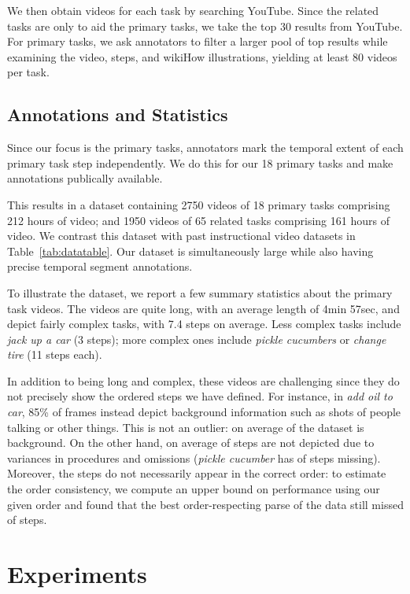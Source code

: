 \documentclass[10pt,twocolumn,letterpaper]{article}
\begin{document}
We then obtain videos for each task by searching YouTube. Since the related
tasks are only to aid the primary tasks, we take the top 30 results from
YouTube. For primary tasks, we ask annotators to filter a larger pool of top results while examining
the video, steps, and wikiHow illustrations, yielding at least 80 videos per task.

\subsection{Annotations and Statistics}

Since our focus is the primary tasks, annotators mark the temporal extent of each primary task step
independently. We do this for our 18 primary tasks and make annotations publically available.

 This results in a dataset containing 2750 videos of 18 primary
tasks comprising 212 hours of video; and 1950 videos of 65 related tasks comprising
161 hours of video.  We contrast this dataset with past
instructional video datasets in Table~\ref{tab:datatable}. Our dataset is
simultaneously large while also having precise temporal segment annotations.

To illustrate the dataset, we report a few summary statistics about the
primary task videos.
The videos are quite long, with an average length of 4min 57sec, and depict
fairly complex tasks, with 7.4 steps on average.  Less complex tasks include
{\it jack up a car} (3 steps); more complex ones include {\it pickle cucumbers} or
{\it change tire} (11 steps each).

In addition to being long and complex, these videos are challenging since they do
not precisely show the ordered steps we have defined.
For instance, in {\it add oil to car}, 85\% of frames
instead depict background information such as shots of people talking
or other things. This is not an outlier: on average  of the dataset
is background. On the other hand, on average  of steps are
not depicted due to variances in procedures and omissions ({\it pickle cucumber} has  of steps missing).
Moreover, the steps do not necessarily appear in the correct order: to estimate the order consistency,
we compute an upper bound on performance using our given order and found that
the best order-respecting parse of the data still missed  of steps.

\section{Experiments}
\label{sec:experiments}
\end{document}
